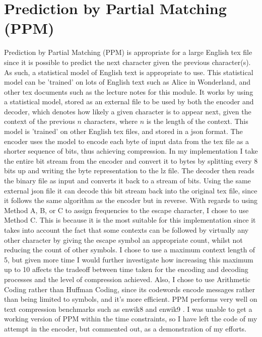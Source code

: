 \documentclass[a4paper, 11pt]{article}
\numberwithin{equation}{section}
\begin{document}
\section{Prediction by Partial Matching (PPM)}

Prediction by Partial Matching (PPM) is appropriate for a large English tex file since it is possible to 
predict the next character given the previous character(s). 
As such, a statistical model of English text is appropriate to use. 
This statistical model can be 'trained' on lots of English text such as Alice in Wonderland, 
and other tex documents such as the lecture notes for this module. 
It works by using a statistical model, stored as an external file to be used by both the encoder and decoder, 
which denotes how likely a given character is to appear next, given the context of the previous $n$ characters, 
where $n$ is the length of the context. 
This model is 'trained' on other English tex files, and stored in a json format. 
The encoder uses the model to encode each byte of input data from the tex file as a shorter sequence of bits, 
thus achieving compression. 
In my implementation I take the entire bit stream from the encoder and convert it to bytes by splitting 
every 8 bits up and writing the byte representation to the lz file. 
The decoder then reads the binary file as input and converts it back to a stream of bits. 
Using the same external json file it can decode this bit stream back into the original tex file, since it 
follows the same algorithm as the encoder but in reverse. 
With regards to using Method A, B, or C to assign frequencies to the escape character, I chose to use 
Method C. 
This is because it is the most suitable for this implementation since it takes into account the fact that 
some contexts can be followed by virtually any other character by giving the escape symbol an appropriate count, 
whilst not reducing the count of other symbols. 
I chose to use a maximum context length of 5, but given more time I would further investigate how 
increasing this maximum up to 10 affects the tradeoff between time taken for the encoding and decoding 
processes and the level of compression achieved. 
Also, I chose to use Arithmetic Coding rather than Huffman Coding, since its codewords encode messages 
rather than being limited to symbols, and it's more efficient. 
PPM performs very well on text compression benchmarks such as enwik8 and enwik9 \cite{TextBenchmark}. 
I was unable to get a working version of PPM within the time constraints, so I have left the code of 
my attempt in the encoder, but commented out, as a demonstration of my efforts. 
\end{document}
